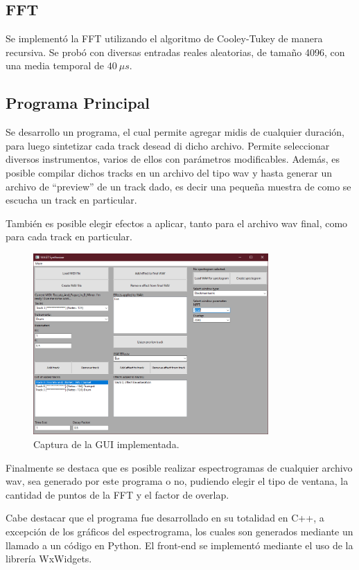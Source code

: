 \subsection{FFT}
Se implementó la FFT utilizando el algoritmo de Cooley-Tukey de manera recursiva. Se probó con diversas entradas reales aleatorias, de tamaño 4096, con una media temporal de $40 \ \mu s$.

\subsection{Programa Principal}
Se desarrollo un programa, el cual permite agregar midis de cualquier duración, para luego sintetizar cada track desead di dicho archivo. Permite seleccionar diversos instrumentos, varios de ellos con parámetros modificables. Además, es posible compilar dichos tracks en un archivo del tipo wav y hasta generar un archivo de ``preview'' de un track dado, es decir una pequeña muestra de como se escucha un track en particular.

También es posible elegir efectos a aplicar, tanto para el archivo wav final, como para cada track en particular.

\begin{figure}[H]
	\centering
	\includegraphics[width=0.8\textwidth]{ImagenesEjercicio8/GUI2.PNG}
\caption{Captura de la GUI implementada.}
	\label{fig:gui}
\end{figure}

Finalmente se destaca que es posible realizar espectrogramas de cualquier archivo wav, sea generado por este programa o no, pudiendo elegir el tipo de ventana, la cantidad de puntos de la FFT y el factor de overlap. 

Cabe destacar que el programa fue desarrollado en su totalidad en C++, a excepción de los gráficos del espectrograma, los cuales son generados mediante un llamado a un código en Python. El front-end se implementó mediante el uso de la librería WxWidgets.